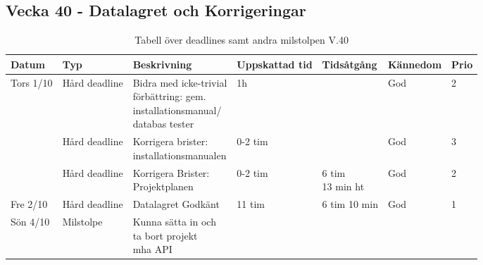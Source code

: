 \documentclass{TDP003mall}
\begin{document}
\newpage

\subsection*{Vecka 40 - Datalagret och Korrigeringar}
\begin{table}[h!]
     \caption{Tabell över deadlines samt andra milstolpen V.40\label{tab:5}}  
\begin{tabularx}{\linewidth}{|l|l|X|l|l|l|l|}
  \hline
  Datum     & Typ           & Beskrivning                                                                                        & Uppskattad tid & Tidsåtgång                        & Kännedom & Prio \\ [0.5ex]
  \hline                                                      
  Tors 1/10 & Hård deadline & \makecell[tl]{Bidra med icke-trivial \\förbättring: gem. \\installationsmanual/\\databas tester} & 1h             &                                   & God      & 2\\
  \hline                                                      
            & Hård deadline & \makecell[tl]{Korrigera brister: \\installationsmanualen}                                          & 0-2 tim        &                                   & God      & 3 \\
  \hline                                                      
            & Hård deadline & \makecell[tl]{Korrigera Brister: \\Projektplanen}                                                  & 0-2 tim        & \makecell[tl]{6 tim \\ 13 min ht} & God      & 2\\
  \hline
  Fre 2/10  & Hård deadline & Datalagret Godkänt                                                                                 & 11 tim         & 6 tim 10 min                      & God      & 1\\
  \hline
  Sön 4/10  & Milstolpe     & \makecell[tl]{Kunna sätta in och\\ ta bort projekt \\ mha API}                                        &                &                                   &          & \\
  \hline
\end{tabularx}   
    \end{table}
    
\end{document}

